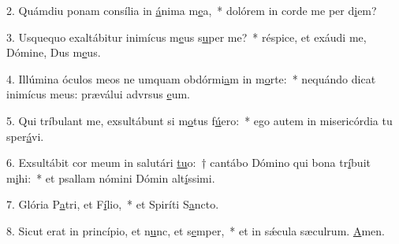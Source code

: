 2. Quámdiu ponam consília in \uline{á}nima m\uline{e}a,~* dolórem in corde me per d\uline{i}em?\par 
3. Usquequo exaltábitur inimícus m\uline{e}us s\uline{u}per me?~* réspice, et exáudi me, Dómine, Dus m\uline{e}us.\par 
4. Illúmina óculos meos ne umquam obdórmi\uline{a}m in m\uline{o}rte:~* nequándo dicat inimícus meus: præválui advrsus \uline{e}um.\par 
5. Qui tríbulant me, exsultábunt si m\uline{o}tus f\uline{ú}ero:~* ego autem in misericórdia tu sper\uline{á}vi.\par 
6. Exsultábit cor meum in salutári \uline{tu}o:~† cantábo Dómino qui bona tr\uline{í}buit m\uline{i}hi:~* et psallam nómini Dómin alt\uline{í}ssimi.\par 
7. Glória P\uline{a}tri, et F\uline{í}lio,~* et Spiríti S\uline{a}ncto.\par 
8. Sicut erat in princípio, et n\uline{u}nc, et s\uline{e}mper,~* et in sǽcula sæculrum. \uline{A}men.\par 
